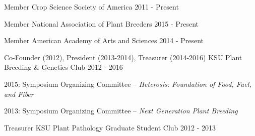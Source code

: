 
\begin{cventries}

  \cventry
    {Member} %
    {Crop Science Society of America} %
    {} %
    {2011 - Present} %
    {}

  \cventry
    {Member} %
    {National Association of Plant Breeders} %
    {} %
    {2015 - Present} %
    {}

  \cventry
    {Member} %
    {American Academy of Arts and Sciences} %
    {} %
    {2014 - Present} %
    {}

  \cventry
    {Co-Founder (2012), President (2013-2014), Treasurer (2014-2016)} %
    {KSU Plant Breeding \& Genetics Club} %
    {} %
    {2012 - 2016} %
    {
      \begin{cvitems} %
        \item {2015: Symposium Organizing Committee – \textit{Heterosis: Foundation of Food, Fuel, and Fiber}}
        \item {2013: Symposium Organizing Committee – \textit{Next Generation Plant Breeding}}
      \end{cvitems}
    }

  \cventry
    {Treasurer} %
    {KSU Plant Pathology Graduate Student Club } %
    {} %
    {2012 - 2013} %
    {}
\end{cventries}
